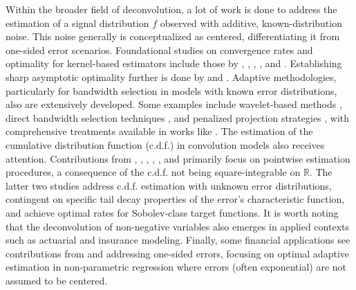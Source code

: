 Within the broader field of deconvolution, a lot of work is done to address the estimation of a signal distribution $f$ observed with additive, known-distribution noise. This noise generally is conceptualized as centered, differentiating it from one-sided error scenarios. Foundational studies on convergence rates and optimality for kernel-based estimators include those by \cite{81}, \cite{82}, \cite{83}, \cite{84}, and \cite{85}. Establishing sharp asymptotic optimality further is done by \cite{86} and \cite{87,88}. Adaptive methodologies, particularly for bandwidth selection in models with known error distributions, also are extensively developed. Some examples include wavelet-based methods \cite{89}, direct bandwidth selection techniques \cite{90}, and penalized projection strategies \cite{91}, with comprehensive treatments available in works like \cite{92}. The estimation of the cumulative distribution function (c.d.f.) in convolution models also receives attention. Contributions from \cite{93}, \cite{84}, \cite{94}, \cite{95}, \cite{96}, and \cite{97} primarily focus on pointwise estimation procedures, a consequence of the c.d.f. not being square-integrable on $\mathbb{R}$. The latter two studies address c.d.f. estimation with unknown error distributions, contingent on specific tail decay properties of the error's characteristic function, and achieve optimal rates for Sobolev-class target functions. It is worth noting that the deconvolution of non-negative variables also emerges in applied contexts such as actuarial and insurance modeling. Finally, some financial applications see contributions from \cite{79} and \cite{80} addressing one-sided errors, focusing on optimal adaptive estimation in non-parametric regression where errors (often exponential) are not assumed to be centered.

